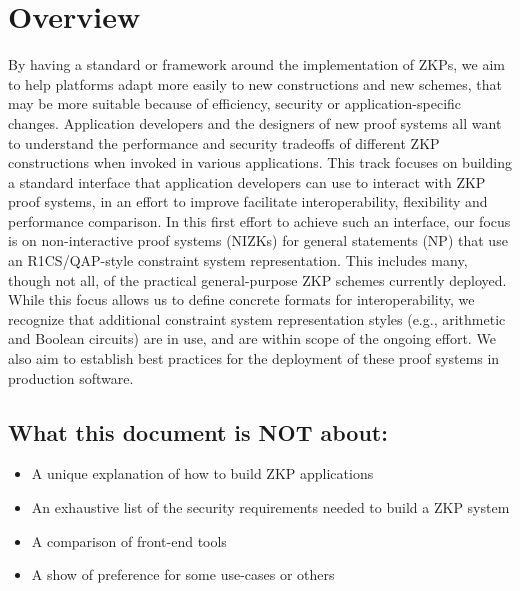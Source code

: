 \section{Overview}
\label{implem:overview}
 
By having a standard or framework around the implementation of ZKPs, we aim to help platforms adapt more easily to new constructions and new schemes, that may be more suitable because of efficiency, security or application-specific changes. 
Application developers and the designers of new proof systems all want to understand the performance and security tradeoffs of different ZKP constructions when invoked in various applications. This track focuses on building a standard interface that application developers can use to interact with ZKP proof systems, in an effort to improve facilitate interoperability, flexibility and performance comparison.
In this first effort to achieve such an interface, our focus is on non-interactive proof systems (NIZKs) for general statements (NP) that use an R1CS/QAP-style constraint system representation. This includes many, though not all, of the practical general-purpose ZKP schemes currently deployed. While this focus allows us to define concrete formats for interoperability, we recognize that additional constraint system representation styles (e.g., arithmetic and Boolean circuits) are in use, and are within scope of the ongoing effort.
We also aim to establish best practices for the deployment of these proof systems in production software.


\subsection{What this document is NOT about:}
\begin{itemize}
 \item A unique explanation of how to build ZKP applications
 \item An exhaustive list of the security requirements needed to build a ZKP system
 \item A comparison of front-end tools
 \item A show of preference for some use-cases or others
\end{itemize}
